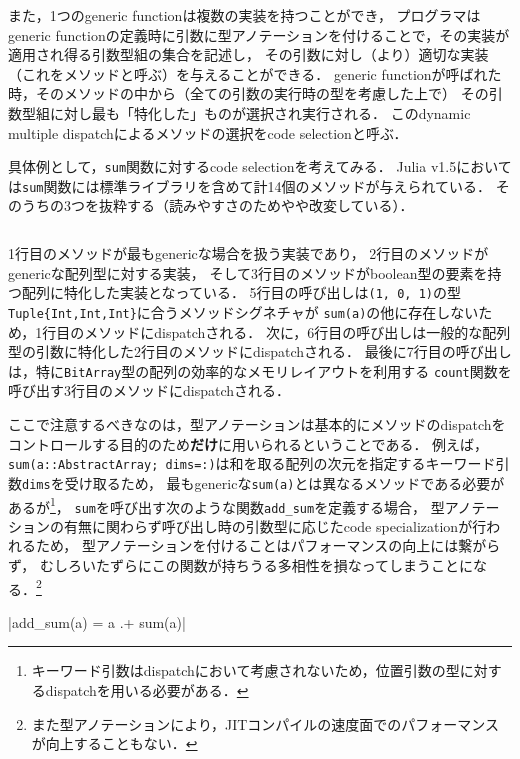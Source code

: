 また，1つのgeneric functionは複数の実装を持つことができ，
プログラマはgeneric functionの定義時に引数に型アノテーションを付けることで，その実装が適用され得る引数型組の集合を記述し，
その引数に対し（より）適切な実装（これをメソッドと呼ぶ）を与えることができる．
generic functionが呼ばれた時，そのメソッドの中から（全ての引数の実行時の型を考慮した上で）
その引数型組に対し最も「特化した\footnotemark」ものが選択され実行される．
このdynamic multiple dispatchによるメソッドの選択をcode selectionと呼ぶ．


具体例として，\verb|sum|関数に対するcode selectionを考えてみる．
Julia v1.5においては\verb|sum|関数には標準ライブラリを含めて計14個のメソッドが与えられている．
そのうちの3つを抜粋する（読みやすさのためやや改変している）．

\inputminted[frame=lines, linenos]{julia}{src/sums_method.jl}

1行目のメソッドが最もgenericな場合を扱う実装であり，
2行目のメソッドがgenericな配列型に対する実装，
そして3行目のメソッドがboolean型の要素を持つ配列に特化した実装となっている．
5行目の呼び出しは\verb|(1, 0, 1)|の型\verb|Tuple{Int,Int,Int}|に合うメソッドシグネチャが
\verb|sum(a)|の他に存在しないため，1行目のメソッドにdispatchされる．
次に，6行目の呼び出しは一般的な配列型の引数に特化した2行目のメソッドにdispatchされる．
最後に7行目の呼び出しは，特に\verb|BitArray|型の配列の効率的なメモリレイアウトを利用する
\verb|count|関数を呼び出す3行目のメソッドにdispatchされる．

ここで注意するべきなのは，型アノテーションは基本的にメソッドのdispatchをコントロールする目的のため\textbf{だけ}に用いられるということである．
例えば，\verb|sum(a::AbstractArray; dims=:)|は和を取る配列の次元を指定するキーワード引数\verb|dims|を受け取るため，
最もgenericな\verb|sum(a)|とは異なるメソッドである必要があるが\footnote{
  キーワード引数はdispatchにおいて考慮されないため，位置引数の型に対するdispatchを用いる必要がある．
}，
\verb|sum|を呼び出す次のような関数\verb|add_sum|を定義する場合，
型アノテーションの有無に関わらず呼び出し時の引数型に応じたcode specializationが行われるため，
型アノテーションを付けることはパフォーマンスの向上には繋がらず，
むしろいたずらにこの関数が持ちうる多相性を損なってしまうことになる．\footnote{
  また型アノテーションにより，JITコンパイルの速度面でのパフォーマンスが向上することもない．
}

|add_sum(a) = a .+ sum(a)|

